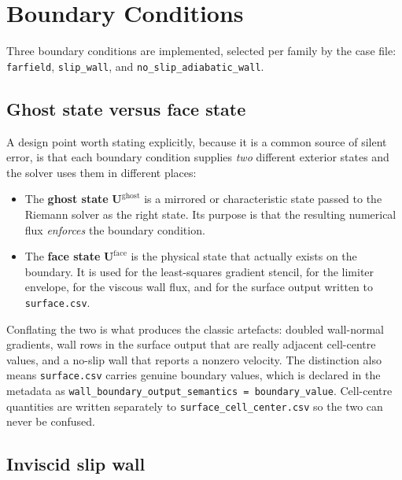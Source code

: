 \section{Boundary Conditions}
\label{sec:bc}

Three boundary conditions are implemented, selected per family by the case file:
\texttt{farfield}, \texttt{slip\_wall}, and \texttt{no\_slip\_adiabatic\_wall}.

\subsection{Ghost state versus face state}
\label{sec:ghostvsface}

A design point worth stating explicitly, because it is a common source of silent
error, is that each boundary condition supplies \emph{two} different exterior
states and the solver uses them in different places:

\begin{itemize}
  \item The \textbf{ghost state} $\mathbf{U}^{\mathrm{ghost}}$ is a mirrored or
  characteristic state passed to the Riemann solver as the right state. Its
  purpose is that the resulting numerical flux \emph{enforces} the boundary
  condition.
  \item The \textbf{face state} $\mathbf{U}^{\mathrm{face}}$ is the physical
  state that actually exists on the boundary. It is used for the least-squares
  gradient stencil, for the limiter envelope, for the viscous wall flux, and for
  the surface output written to \texttt{surface.csv}.
\end{itemize}

Conflating the two is what produces the classic artefacts: doubled wall-normal
gradients, wall rows in the surface output that are really adjacent cell-centre
values, and a no-slip wall that reports a nonzero velocity. The distinction also
means \texttt{surface.csv} carries genuine boundary values, which is declared in
the metadata as \texttt{wall\_boundary\_output\_semantics = boundary\_value}.
Cell-centre quantities are written separately to
\texttt{surface\_cell\_center.csv} so the two can never be confused.

\subsection{Inviscid slip wall}

